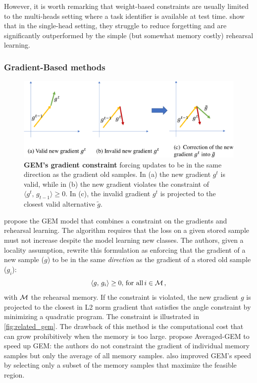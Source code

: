 However, it is worth remarking that weight-based constraints are usually limited to the multi-heads
setting where a task identifier is available at test time. \citet{lesort2019regulshortcomings} show
that in the single-head setting, they struggle to reduce forgetting and are significantly
outperformed by the simple (but somewhat memory costly) rehearsal learning.

\subsubsection{Gradient-Based methods}
\label{sec:related_regul_gradient}

\begin{figure}[tb]
      \begin{center}
            \includegraphics[width=1.0\linewidth]{images/related/gem.pdf}
      \end{center}
      \caption{\textbf{GEM's gradient constraint} forcing updates to be in the same direction as the
            gradient \wrt old samples. In (a) the new gradient $g^t$ is valid, while in (b) the new gradient
            violates the constraint of $\langle g^t,\, g_{t-1}\rangle \ge 0$. In (c), the invalid gradient
            $g^t$ is projected to the closest valid alternative $\tilde{g}$.}
      \label{fig:related_gem}
\end{figure}

\citet{lopezpaz2017gem} propose the GEM model that combines a constraint on the gradients and
rehearsal learning. The algorithm requires that the loss on a given stored sample must not increase
despite the model learning new classes. The authors, given a locality assumption, rewrite this
formulation as enforcing that the gradient of a new sample ($g$) to be in the same \textit{direction} as
the gradient of a stored old sample ($g_i$):
%
\begin{equation}
      \langle g,\, g_i\rangle \ge 0,\, \text{for all}\, i \in \mathcal{M}\,,
\end{equation}
%
\noindent with $\mathcal{M}$ the rehearsal memory. If the constraint is violated, the new gradient $g$ is
projected to the closest in L2 norm gradient that satisfies the angle constraint by minimizing a
quadratic program. The constraint is illustrated in \autoref{fig:related_gem}. The drawback of this
method is the computational cost that can grow prohibitively when the memory is too large.
\citet{chaudhry2019AGEM} propose Averaged-GEM to speed up GEM: the authors do not constraint the
gradient of individual memory samples but only the average of all memory samples.
\citet{aljundi2019gradientselection} also improved GEM's speed by selecting only a subset of the
memory samples that maximize the feasible region.

